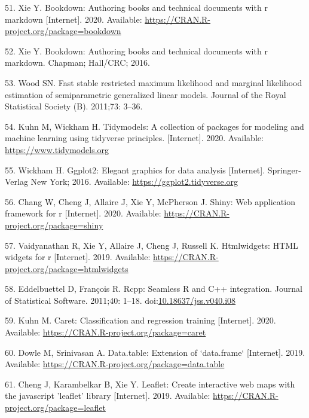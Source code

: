 \documentclass[10pt,letterpaper]{article}
\begin{document}
\leavevmode\hypertarget{ref-bookdown}{}%
51. Xie Y. Bookdown: Authoring books and technical documents with r
markdown {[}Internet{]}. 2020. Available:
\url{https://CRAN.R-project.org/package=bookdown}

\leavevmode\hypertarget{ref-xie2016}{}%
52. Xie Y. Bookdown: Authoring books and technical documents with r
markdown. Chapman; Hall/CRC; 2016.

\leavevmode\hypertarget{ref-mgcv}{}%
53. Wood SN. Fast stable restricted maximum likelihood and marginal
likelihood estimation of semiparametric generalized linear models.
Journal of the Royal Statistical Society (B). 2011;73: 3--36.

\leavevmode\hypertarget{ref-tidymodels}{}%
54. Kuhn M, Wickham H. Tidymodels: A collection of packages for modeling
and machine learning using tidyverse principles. {[}Internet{]}. 2020.
Available: \url{https://www.tidymodels.org}

\leavevmode\hypertarget{ref-ggplot2}{}%
55. Wickham H. Ggplot2: Elegant graphics for data analysis
{[}Internet{]}. Springer-Verlag New York; 2016. Available:
\url{https://ggplot2.tidyverse.org}

\leavevmode\hypertarget{ref-shiny}{}%
56. Chang W, Cheng J, Allaire J, Xie Y, McPherson J. Shiny: Web
application framework for r {[}Internet{]}. 2020. Available:
\url{https://CRAN.R-project.org/package=shiny}

\leavevmode\hypertarget{ref-htmlwidgets}{}%
57. Vaidyanathan R, Xie Y, Allaire J, Cheng J, Russell K. Htmlwidgets:
HTML widgets for r {[}Internet{]}. 2019. Available:
\url{https://CRAN.R-project.org/package=htmlwidgets}

\leavevmode\hypertarget{ref-Rcpp}{}%
58. Eddelbuettel D, François R. Rcpp: Seamless R and C++ integration.
Journal of Statistical Software. 2011;40: 1--18.
doi:\href{https://doi.org/10.18637/jss.v040.i08}{10.18637/jss.v040.i08}

\leavevmode\hypertarget{ref-caret}{}%
59. Kuhn M. Caret: Classification and regression training
{[}Internet{]}. 2020. Available:
\url{https://CRAN.R-project.org/package=caret}

\leavevmode\hypertarget{ref-datatable}{}%
60. Dowle M, Srinivasan A. Data.table: Extension of `data.frame`
{[}Internet{]}. 2019. Available:
\url{https://CRAN.R-project.org/package=data.table}

\leavevmode\hypertarget{ref-leaflet}{}%
61. Cheng J, Karambelkar B, Xie Y. Leaflet: Create interactive web maps
with the javascript 'leaflet' library {[}Internet{]}. 2019. Available:
\url{https://CRAN.R-project.org/package=leaflet}
\end{document}
